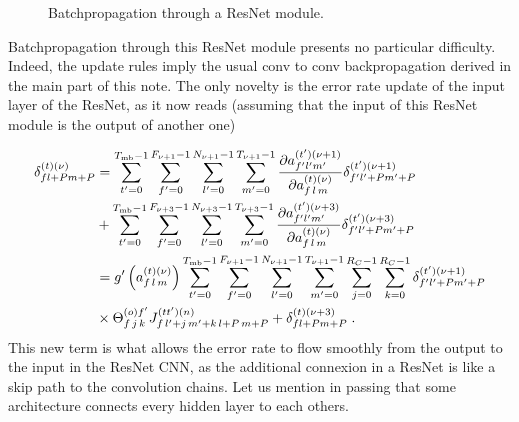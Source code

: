 \begin{subappendices}
\begin{figure}[H]
\begin{center}
\caption{Batchpropagation through a ResNet module.}
\end{center}
\end{figure}

Batchpropagation through this ResNet module presents no particular difficulty. Indeed, the update rules imply the usual conv to conv backpropagation derived in the main part of this note. The only novelty is the error rate update of the input layer of the ResNet, as it now reads (assuming that the input of this ResNet module is the output of another one)

\begin{align}
\delta^{(t)(\nu)}_{fl+Pm+P}&=
%
\sum_{t'=0}^{T_{{\rm mb}}-1}\sum^{F_{\nu+1}-1}_{f'=0}\sum^{N_{\nu+1}-1}_{l'=0}\sum^{T_{\nu+1}-1}_{m'=0}
%
\frac{\partial a_{f'l'm'}^{(t')(\nu+1)}}{\partial a_{f\,l\,m}^{(t)(\nu)}}
%
\delta_{f'l'+Pm'+P}^{(t')(\nu+1)}\notag\\
%
&+\sum_{t'=0}^{T_{{\rm mb}}-1}\sum^{F_{\nu+3}-1}_{f'=0}\sum^{N_{\nu+3}-1}_{l'=0}\sum^{T_{\nu+3}-1}_{m'=0}
%
\frac{\partial a_{f'l'm'}^{(t')(\nu+3)}}{\partial a_{f\,l\,m}^{(t)(\nu)}}
%
\delta_{f'l'+Pm'+P}^{(t')(\nu+3)}\notag\\
%
&=g'\left(a_{f\,l\,m}^{(t)(\nu)}\right)
%
\sum_{t'=0}^{T_{{\rm mb}}-1}\sum^{F_{\nu+1}-1}_{f'=0}\sum^{N_{\nu+1}-1}_{l'=0}\sum^{T_{\nu+1}-1}_{m'=0}
%
\sum^{R_C-1}_{j=0}\sum^{R_C-1}_{k=0}\delta_{f'l'+Pm'+P}^{(t')(\nu+1)}\notag\\
%
&\times \Theta^{(o)f'}_{f\,j\,k} J^{(tt')(n)}_{f\, l'+j\,m'+k\,l+P\,m+P}
%
+\delta_{fl+Pm+P}^{(t)(\nu+3)}\;.
\end{align}
This new term is what allows the error rate to flow smoothly from the output to the input in the ResNet CNN, as the additional connexion in a ResNet is like a skip path to the convolution chains. Let us mention in passing that some architecture connects every hidden layer to each others\cite{HuangGLZLW}.



\end{subappendices}
